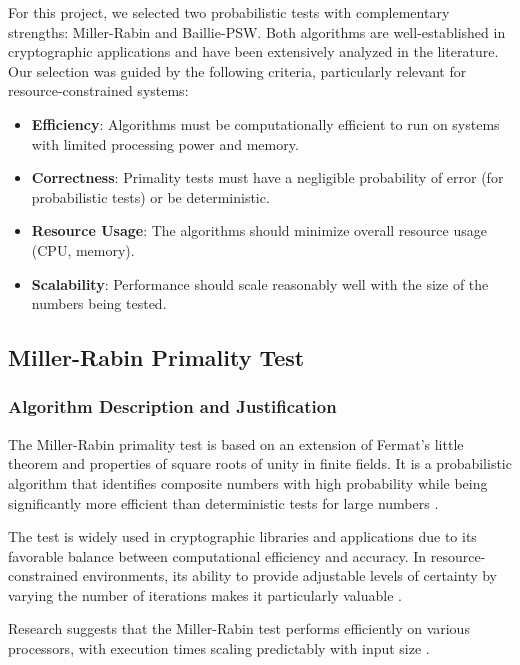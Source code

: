 For this project, we selected two probabilistic tests with complementary strengths: Miller-Rabin and Baillie-PSW. Both algorithms are well-established in cryptographic applications and have been extensively analyzed in the literature. Our selection was guided by the following criteria, particularly relevant for resource-constrained systems:

\begin{itemize}
    \item \textbf{Efficiency}: Algorithms must be computationally efficient to run on systems with limited processing power and memory.
    \item \textbf{Correctness}: Primality tests must have a negligible probability of error (for probabilistic tests) or be deterministic.
    \item \textbf{Resource Usage}: The algorithms should minimize overall resource usage (CPU, memory).
    \item \textbf{Scalability}: Performance should scale reasonably well with the size of the numbers being tested.
\end{itemize}

\subsection{Miller-Rabin Primality Test}

\subsubsection{Algorithm Description and Justification}

The Miller-Rabin primality test is based on an extension of Fermat's little theorem and properties of square roots of unity in finite fields. It is a probabilistic algorithm that identifies composite numbers with high probability while being significantly more efficient than deterministic tests for large numbers \cite{miller1975, rabin1980}.

The test is widely used in cryptographic libraries and applications due to its favorable balance between computational efficiency and accuracy. In resource-constrained environments, its ability to provide adjustable levels of certainty by varying the number of iterations makes it particularly valuable \cite{taxonomy_primality, hardware_baillie}.

Research suggests that the Miller-Rabin test performs efficiently on various processors, with execution times scaling predictably with input size \cite{taxonomy_primality}.

